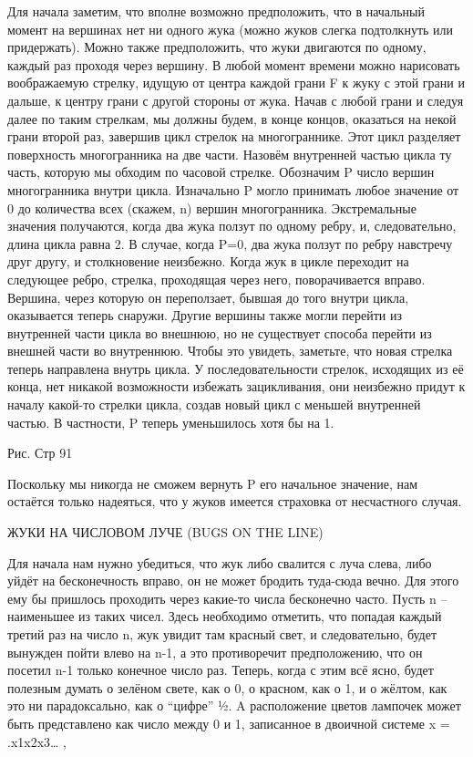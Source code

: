     Для начала заметим, что вполне возможно предположить, что в начальный момент на вершинах нет ни одного жука (можно жуков слегка подтолкнуть или придержать). Можно также предположить, что жуки двигаются по одному, каждый раз проходя через вершину.
   В любой момент времени можно нарисовать воображаемую стрелку, идущую от центра каждой грани F  к  жуку с этой грани и дальше, к центру грани с другой стороны от жука.
Начав с любой грани и следуя далее по таким стрелкам, мы должны будем, в конце концов, оказаться на некой грани второй раз, завершив цикл стрелок на многограннике.
  Этот цикл  разделяет поверхность многогранника на две части. Назовём внутренней частью цикла ту часть, которую мы обходим по часовой стрелке. Обозначим P число вершин многогранника внутри цикла.
  Изначально P могло принимать любое значение от 0 до количества всех (скажем, n) вершин многогранника. Экстремальные значения получаются, когда два жука ползут по одному ребру, и, следовательно, длина цикла равна 2. В случае, когда P=0, два жука ползут по ребру навстречу друг другу, и столкновение неизбежно.
  Когда жук в цикле переходит на следующее ребро, стрелка, проходящая через него, поворачивается вправо. Вершина, через которую он переползает, бывшая до того внутри цикла, оказывается теперь снаружи. Другие вершины также могли перейти из внутренней части цикла во внешнюю, но не существует способа перейти из внешней части во внутреннюю. Чтобы это увидеть, заметьте, что новая стрелка теперь направлена внутрь цикла. У последовательности стрелок, исходящих из её конца, нет никакой возможности избежать зацикливания, они неизбежно придут к началу какой-то стрелки цикла, создав новый цикл с меньшей внутренней частью. В частности, P теперь уменьшилось хотя бы на 1. 
     
                                  Рис. Стр 91
 
     Поскольку мы никогда не сможем вернуть P  его начальное значение, нам остаётся только надеяться, что у жуков имеется страховка от несчастного случая.




ЖУКИ НА ЧИСЛОВОМ ЛУЧЕ (BUGS ON THE LINE)


    Для начала нам  нужно убедиться, что жук либо свалится с луча слева, либо уйдёт на бесконечность вправо, он не может бродить туда-сюда вечно. Для этого ему бы пришлось проходить через какие-то числа бесконечно часто. Пусть n -- наименьшее из таких чисел.
Здесь необходимо отметить, что попадая каждый третий раз на число n, жук увидит там красный свет, и следовательно, будет вынужден пойти влево на n-1, а это противоречит предположению, что он посетил n-1 только конечное число раз.
   Теперь, когда с этим всё ясно, будет полезным думать о зелёном свете, как о 0, о красном, как о 1, и о жёлтом, как это ни парадоксально, как о “цифре” ½. A расположение цветов лампочек может быть представлено как число между 0 и 1, записанное в двоичной системе
                        x = .x1x2x3… ,


